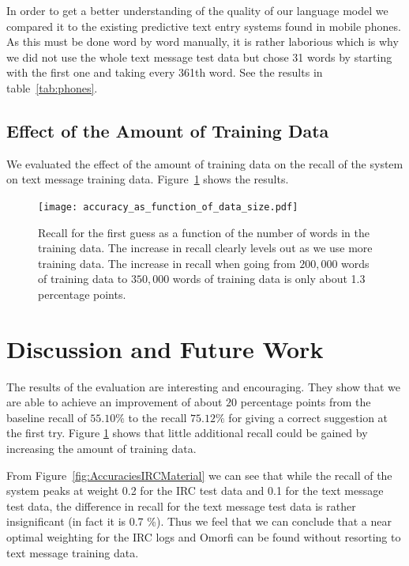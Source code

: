 \documentclass[a4paper,conference]{IEEEtran}
\begin{document}
In order to get a better understanding of the quality of our language
model we compared it to the existing predictive text entry systems
found in mobile phones. As this must be done word by word manually, it
is rather laborious which is why we did not use the whole text message
test data but chose 31 words by starting with the first one and taking
every 361th word. See the results in table~\ref{tab:phones}.

\subsection{Effect of the Amount of Training Data}

We evaluated the effect of the amount of training data on the recall
of the system on text message training
data. Figure~\ref{fig:SaturationGraph} shows the results. 

\begin{figure}[!t]
\begin{center}
\texttt{[image: accuracy\_as\_function\_of\_data\_size.pdf]}
\end{center}
\caption{Recall for the first guess as a function of the number of words in the training data. The increase in recall clearly levels out as we use more training data. The increase in recall when going from $200,000$ words of training data to $350,000$ words of training data is only about 1.3 percentage points.}
\label{fig:SaturationGraph}
\end{figure}

\section{Discussion and Future Work}
\label{sec:discussion}

The results of the evaluation are interesting and encouraging. They
show that we are able to achieve an improvement of about $20$
percentage points from the baseline recall of $55.10 \%$ to the recall
$75.12 \%$ for giving a correct suggestion at the first try. Figure
\ref{fig:SaturationGraph} shows that little additional recall could be
gained by increasing the amount of training data.

From Figure~\ref{fig:AccuraciesIRCMaterial} we can see that while the
recall of the system peaks at weight 0.2 for the IRC test data and
0.1 for the text message test data, the difference in recall for the
text message test data is rather insignificant (in fact it is
0.7 \%). Thus we feel that we can conclude that a near optimal
weighting for the IRC logs and Omorfi can be found without resorting
to text message training data.
\end{document}
